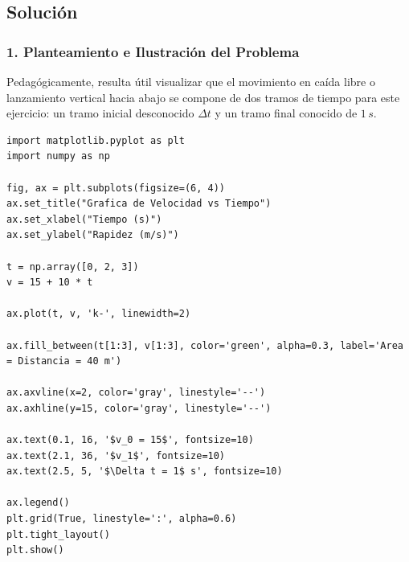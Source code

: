\documentclass[12pt, a4paper]{article}
\begin{document}
\begin{center}
\end{center}

\subsection*{Solución}

\subsubsection*{1. Planteamiento e Ilustración del Problema}
Pedagógicamente, resulta útil visualizar que el movimiento en caída libre o lanzamiento vertical hacia abajo se compone de dos tramos de tiempo para este ejercicio: un tramo inicial desconocido $\Delta t$ y un tramo final conocido de $1 \, \si{s}$.

\begin{lstlisting}
import matplotlib.pyplot as plt
import numpy as np

fig, ax = plt.subplots(figsize=(6, 4))
ax.set_title("Grafica de Velocidad vs Tiempo")
ax.set_xlabel("Tiempo (s)")
ax.set_ylabel("Rapidez (m/s)")

t = np.array([0, 2, 3])
v = 15 + 10 * t 

ax.plot(t, v, 'k-', linewidth=2)

ax.fill_between(t[1:3], v[1:3], color='green', alpha=0.3, label='Area = Distancia = 40 m')

ax.axvline(x=2, color='gray', linestyle='--')
ax.axhline(y=15, color='gray', linestyle='--')

ax.text(0.1, 16, '$v_0 = 15$', fontsize=10)
ax.text(2.1, 36, '$v_1$', fontsize=10)
ax.text(2.5, 5, '$\Delta t = 1$ s', fontsize=10)

ax.legend()
plt.grid(True, linestyle=':', alpha=0.6)
plt.tight_layout()
plt.show()
\end{lstlisting}
\end{document}
